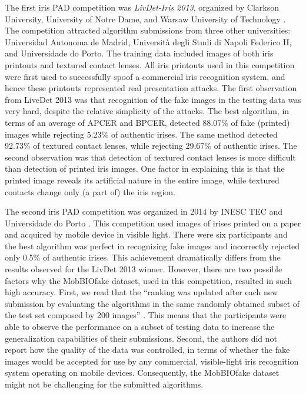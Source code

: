 \documentclass[format=acmsmall, review=false, timestamp=false]{acmart}
\begin{document}
The first iris PAD competition was {\it LivDet-Iris 2013}, organized by Clarkson University, University of Notre Dame, and Warsaw University of Technology \cite{Yambay_IJCB_2014}. The competition attracted algorithm submissions from three other universities: Universidad Autonoma de Madrid, {Universit\`{a}} degli Studi di Napoli Federico II, and Universidade do Porto. The training data included images of both iris printouts and textured contact lenses. All iris printouts used in this competition were first used to successfully spoof a commercial iris recognition system, and hence the{se} printouts represented real presentation attacks. The first observation from LiveDet 2013 was that recognition of the {fake} images in the testing data was very hard, despite the relative simplicity of the attacks. The best algorithm, in terms of {an average of APCER and BPCER}, detected 88.07\% of {fake (printed)} images while rejecting 5.23\% of authentic irises. The same method detected 92.73\% of textured contact lenses, while rejecting 29.67\% of authentic irises. The second observation was that detection of textured contact lenses is more difficult than detection of printed iris images. One factor in explaining this is that the printed image reveals its artificial nature in the entire image, while textured contacts change only (a part of) the iris region. 

The second iris PAD competition was organized in 2014 by INESC TEC and Universidade do Porto \cite{Sequeira_IJCB_2014}. This competition used images of irises printed on a paper and acquired by mobile device in visible light. There were six participants and the best algorithm was perfect in recognizing {fake} images and incorrectly rejected only 0.5\% of authentic irises. This achievement dramatically differs from the results observed for the LivDet 2013 winner. However, there are two possible factors why the {\sf MobBIOfake} dataset, used in this competition, resulted in such high accuracy. First, we read that the ``ranking was updated after each new submission by evaluating the algorithms in the same randomly obtained subset of the test set composed by 200 images'' \cite{Sequeira_IJCB_2014}. {This means that the participants were able to observe the performance on a subset of testing data to increase the generalization capabilities of their submissions.} Second, the authors did not report how the quality of the data was controlled, in terms of whether the {fake} images would be accepted for use by any commercial, visible-light iris recognition system operating on mobile devices. Consequently, the {\sf MobBIOfake} dataset might not be challenging for the submitted algorithms.
\end{document}
